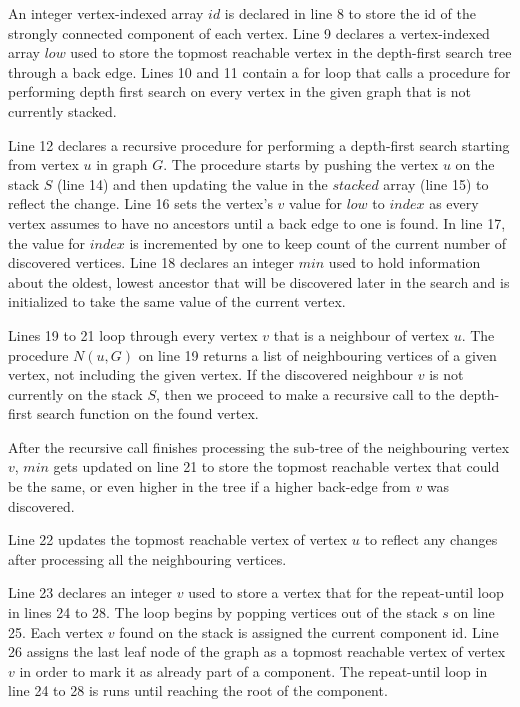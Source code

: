 \documentclass{l4proj}
\begin{document}
\noindent An integer vertex-indexed array $id$ is declared in line 8 to store the id of the strongly connected component of each vertex. Line 9 declares a vertex-indexed array $low$ used to store the topmost reachable vertex in the depth-first search tree through a back edge. Lines 10 and 11 contain a for loop that calls a procedure for performing depth first search on every vertex in the given graph that is not currently stacked.

\noindent Line 12 declares a recursive procedure for performing a depth-first search starting from vertex $u$ in graph $G$. The procedure starts by pushing the vertex $u$ on the stack $S$ (line 14) and then updating the value in the $stacked$ array (line 15) to reflect the change. Line 16 sets the vertex's $v$ value for $low$ to $index$ as every vertex assumes to have no ancestors until a back edge to one is found. In line 17, the value for $index$ is incremented by one to keep count of the current number of discovered vertices. Line 18 declares an integer $min$ used to hold information about the oldest, lowest ancestor that will be discovered later in the search and is initialized to take the same value of the current vertex.

\noindent Lines 19 to 21 loop through every vertex $v$ that is a neighbour of vertex $u$. The procedure $N(u, G)$ on line 19 returns a list of neighbouring vertices of a given vertex, not including the given vertex. If the discovered neighbour $v$ is not currently on the stack $S$, then we proceed to make a recursive call to the depth-first search function on the found vertex.

\noindent After the recursive call finishes processing the sub-tree of the neighbouring vertex $v$, $min$ gets updated on line 21 to store the topmost reachable vertex that could be the same, or even higher in the tree if a higher back-edge from $v$ was discovered.

\noindent Line 22 updates the topmost reachable vertex of vertex $u$ to reflect any changes after processing all the neighbouring vertices.

\noindent Line 23 declares an integer $v$ used to store a vertex that for the repeat-until loop in lines 24 to 28. The loop begins by popping vertices out of the stack $s$ on line 25. Each vertex $v$ found on the stack is assigned the current component id. Line 26 assigns the last leaf node of the graph as a topmost reachable vertex of vertex $v$ in order to mark it as already part of a component. The repeat-until loop in line 24 to 28 is runs until reaching the root of the component.
\end{document}
